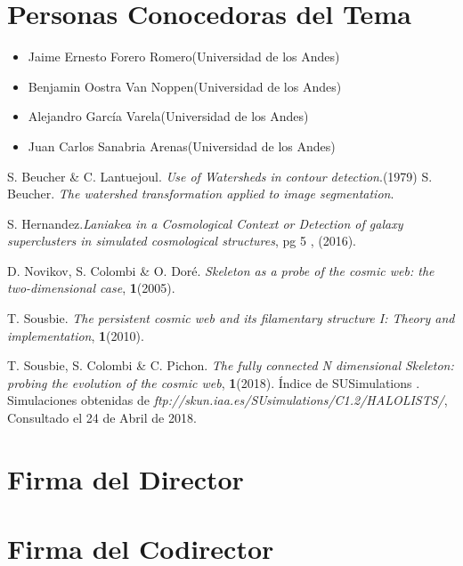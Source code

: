 \documentclass[12pt]{article}
\begin{document}
\section{Personas Conocedoras del Tema}


\begin{itemize}
	\item Jaime Ernesto Forero Romero(Universidad de los Andes)
	\item Benjamin Oostra Van Noppen(Universidad de los Andes)
	\item Alejandro García Varela(Universidad de los Andes)
    \item Juan Carlos Sanabria Arenas(Universidad de los Andes)
\end{itemize}


\begin{thebibliography}{10}

 S. Beucher \& C. Lantuejoul. \textit{Use of Watersheds in contour detection}.(1979) 
 S. Beucher. \textit{The watershed transformation applied to image segmentation}.

 S. Hernandez.\textit{Laniakea in a Cosmological Context or Detection of galaxy superclusters in simulated cosmological structures}, pg 5 , (2016).

 D. Novikov, S. Colombi \& O. Doré. \textit{Skeleton as a probe of the cosmic web: the two-dimensional case}, \textbf{1}(2005).

 T. Sousbie. \textit{The persistent cosmic web and its filamentary structure I: Theory and implementation}, \textbf{1}(2010).

 T. Sousbie, S. Colombi \& C. Pichon. \textit{The fully connected N dimensional Skeleton: probing the evolution of the cosmic web}, \textbf{1}(2018).
 Índice de SUSimulations . Simulaciones obtenidas de \textit{ftp://skun.iaa.es/SUsimulations/C1.2/HALOLISTS/}, Consultado el 24 de Abril de 2018.




\end{thebibliography}

\section*{Firma del Director}
\vspace{1.5cm}

\section*{Firma del Codirector	}
\end{document}
